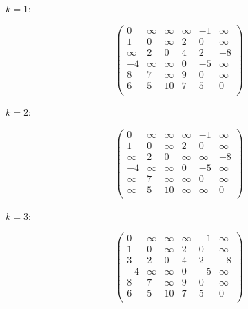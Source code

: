 \documentclass[a4paper]{article}
\begin{document}
\paragraph{$k=1:$}
$$
    \begin{pmatrix}
        0      & \infty & \infty & \infty & -1 & \infty \\
        1      & 0      & \infty & 2      & 0  & \infty \\
        \infty & 2      & 0      & 4      & 2  & -8     \\
        -4     & \infty & \infty & 0      & -5 & \infty \\
        8      & 7      & \infty & 9      & 0  & \infty \\
        6      & 5      & 10     & 7      & 5  & 0      \\
    \end{pmatrix}
$$
\paragraph{$k=2:$}
$$
    \begin{pmatrix}
        0      & \infty & \infty & \infty & -1     & \infty \\
        1      & 0      & \infty & 2      & 0      & \infty \\
        \infty & 2      & 0      & \infty & \infty & -8     \\
        -4     & \infty & \infty & 0      & -5     & \infty \\
        \infty & 7      & \infty & \infty & 0      & \infty \\
        \infty & 5      & 10     & \infty & \infty & 0      \\
    \end{pmatrix}
$$
\paragraph{$k=3:$}
$$
    \begin{pmatrix}
        0  & \infty & \infty & \infty & -1 & \infty \\
        1  & 0      & \infty & 2      & 0  & \infty \\
        3  & 2      & 0      & 4      & 2  & -8     \\
        -4 & \infty & \infty & 0      & -5 & \infty \\
        8  & 7      & \infty & 9      & 0  & \infty \\
        6  & 5      & 10     & 7      & 5  & 0      \\
    \end{pmatrix}
$$
\end{document}
